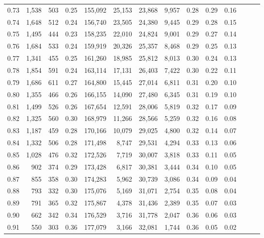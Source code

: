 \begin{tabular}{rrrrrrrrrrrrrr}
0.73 &  1,538 &  503 &  0.25 &  155,092 &   25,153 &  23,868 &   9,957 &  0.28 &  0.29 &      0.16 \\
0.74 &  1,648 &  512 &  0.24 &  156,740 &   23,505 &  24,380 &   9,445 &  0.29 &  0.28 &      0.15 \\
0.75 &  1,495 &  444 &  0.23 &  158,235 &   22,010 &  24,824 &   9,001 &  0.29 &  0.27 &      0.14 \\
0.76 &  1,684 &  533 &  0.24 &  159,919 &   20,326 &  25,357 &   8,468 &  0.29 &  0.25 &      0.13 \\
0.77 &  1,341 &  455 &  0.25 &  161,260 &   18,985 &  25,812 &   8,013 &  0.30 &  0.24 &      0.13 \\
0.78 &  1,854 &  591 &  0.24 &  163,114 &   17,131 &  26,403 &   7,422 &  0.30 &  0.22 &      0.11 \\
0.79 &  1,686 &  611 &  0.27 &  164,800 &   15,445 &  27,014 &   6,811 &  0.31 &  0.20 &      0.10 \\
0.80 &  1,355 &  466 &  0.26 &  166,155 &   14,090 &  27,480 &   6,345 &  0.31 &  0.19 &      0.10 \\
0.81 &  1,499 &  526 &  0.26 &  167,654 &   12,591 &  28,006 &   5,819 &  0.32 &  0.17 &      0.09 \\
0.82 &  1,325 &  560 &  0.30 &  168,979 &   11,266 &  28,566 &   5,259 &  0.32 &  0.16 &      0.08 \\
0.83 &  1,187 &  459 &  0.28 &  170,166 &   10,079 &  29,025 &   4,800 &  0.32 &  0.14 &      0.07 \\
0.84 &  1,332 &  506 &  0.28 &  171,498 &    8,747 &  29,531 &   4,294 &  0.33 &  0.13 &      0.06 \\
0.85 &  1,028 &  476 &  0.32 &  172,526 &    7,719 &  30,007 &   3,818 &  0.33 &  0.11 &      0.05 \\
0.86 &    902 &  374 &  0.29 &  173,428 &    6,817 &  30,381 &   3,444 &  0.34 &  0.10 &      0.05 \\
0.87 &    855 &  358 &  0.30 &  174,283 &    5,962 &  30,739 &   3,086 &  0.34 &  0.09 &      0.04 \\
0.88 &    793 &  332 &  0.30 &  175,076 &    5,169 &  31,071 &   2,754 &  0.35 &  0.08 &      0.04 \\
0.89 &    791 &  365 &  0.32 &  175,867 &    4,378 &  31,436 &   2,389 &  0.35 &  0.07 &      0.03 \\
0.90 &    662 &  342 &  0.34 &  176,529 &    3,716 &  31,778 &   2,047 &  0.36 &  0.06 &      0.03 \\
0.91 &    550 &  303 &  0.36 &  177,079 &    3,166 &  32,081 &   1,744 &  0.36 &  0.05 &      0.02 \\

\end{tabular}
